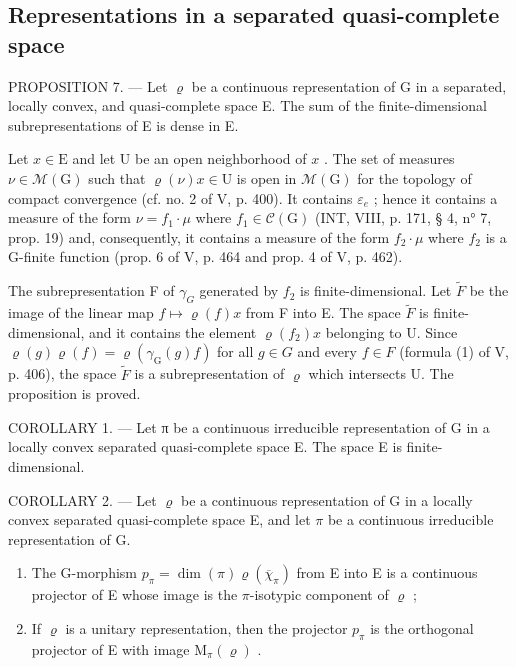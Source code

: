 \subsection{Representations in a separated quasi-complete space}

PROPOSITION 7. --- Let \(\varrho\) be a continuous representation of G in a separated, locally convex, and quasi-complete space E. The sum of the finite-dimensional subrepresentations of E is dense in E.

Let \(x \in \mathrm{E}\) and let U be an open neighborhood of \(x\) . The set of measures \(\nu \in \mathcal{M}(\mathrm{G})\) such that \(\varrho(\nu)x \in \mathrm{U}\) is open in \(\mathcal{M}(\mathrm{G})\) for the topology of compact convergence (cf. no. 2 of V, p. 400). It contains \(\varepsilon_e\) ; hence it contains a measure of the form \(\nu = f_1 \cdot \mu\) where \(f_1 \in \mathcal{C}(\mathrm{G})\) (INT, VIII, p. 171, § 4, n° 7, prop. 19) and, consequently, it contains a measure of the form \(f_2 \cdot \mu\) where \(f_2\) is a G-finite function (prop. 6 of V, p. 464 and prop. 4 of V, p. 462).

The subrepresentation F of \(\gamma_{G}\) generated by \(f_{2}\) is finite-dimensional. Let \(\widetilde{F}\) be the image of the linear map \(f \mapsto \varrho(f)x\) from F into E. The space \(\widetilde{F}\) is finite-dimensional, and it contains the element \(\varrho(f_{2})x\) belonging to U. Since \(\varrho(g)\varrho(f) = \varrho(\gamma_{\mathrm{G}}(g)f)\) for all \(g \in G\) and every \(f \in F\) (formula (1) of V, p. 406), the space \(\widetilde{F}\) is a subrepresentation of \(\varrho\) which intersects U. The proposition is proved.

COROLLARY 1. --- Let π be a continuous irreducible representation of G in a locally convex separated quasi-complete space E. The space E is finite-dimensional.

COROLLARY 2. --- Let \(\varrho\) be a continuous representation of G in a locally convex separated quasi-complete space E, and let \(\pi\) be a continuous irreducible representation of G.

\begin{enumerate}
\def\labelenumi{\alph{enumi})}
\item
  The G-morphism \(p_{\pi} = \dim(\pi)\varrho(\overline{\chi}_{\pi})\) from E into E is a continuous projector of E whose image is the \(\pi\)-isotypic component of \(\varrho\) ;
\item
  If \(\varrho\) is a unitary representation, then the projector \(p_{\pi}\) is the orthogonal projector of E with image \(\mathrm{M}_{\pi}(\varrho)\) .
\end{enumerate}

